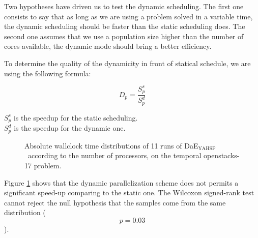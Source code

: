 \documentclass{sig-alternate}
\newcommand{\DAEYAHSP}{{\sc DaE$_{\text{YAHSP}}$}}
\begin{document}


Two hypotheses have driven us to test the dynamic scheduling. The first one consists to say that as long as we are using a problem solved in a variable time, the dynamic scheduling should be faster than the static scheduling does. The second one assumes that we use a population size higher than the number of cores available, the dynamic mode should bring a better efficiency.


To determine the quality of the dynamicity in front of statical schedule, we are using the following formula:

$$D_p = \frac{S^s_p}{S^d_p}$$

$S^s_p$ is the speedup for the static scheduling.\\
$S^d_p$ is the speedup for the dynamic one.\\


\begin{figure}[htpb]
  \begin{center}
    \hfill
  \end{center}
  \caption{Absolute wallclock time distributions of 11 runs of \DAEYAHSP\ according to the number of processors, on the temporal openstacks-17 problem.}
  \label{fig:proc_static_vs_dynamic}
\end{figure}

Figure \ref{fig:proc_static_vs_dynamic} shows that the dynamic parallelization
scheme does not permits a significant speed-up comparing to the static one. The
Wilcoxon signed-rank test cannot reject the null hypothesis that the samples come
from the same distribution ($$p=0.03$$).
\end{document}

